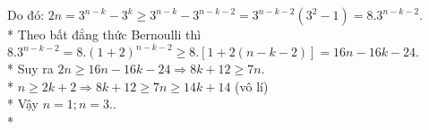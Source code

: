 \begin{ex}
{\begin{enumerate}
        Do đó: $2n = {3^{n - k}} - {3^k} \ge {3^{n - k}} - {3^{n - k - 2}} = {3^{n - k - 2}}\left( {{3^2} - 1} \right) = {8.3^{n - k - 2}}.$\\*
        Theo bất đẳng thức Bernoulli thì ${8.3^{n - k - 2}} = 8.{\left( {1 + 2} \right)^{n - k - 2}} \ge 8.\left[ {1 + 2\left( {n - k - 2} \right)} \right] = 16n - 16k - 24.$\\*
        Suy ra $2n \ge 16n - 16k - 24 \Rightarrow 8k + 12 \ge 7n.$\\*
        $n \ge 2k + 2 \Rightarrow 8k + 12 \ge 7n \ge 14k + 14$ (vô lí)\\*
        Vậy $n = 1;n = 3.$.\\*
    \end{enumerate}
    }
\end{ex}

